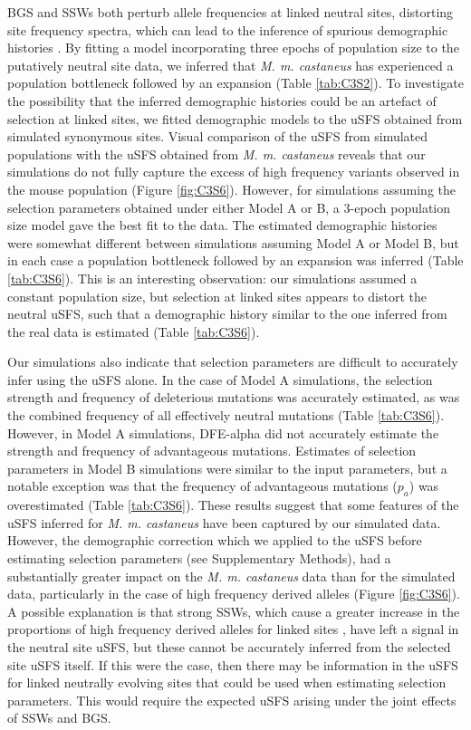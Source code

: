 	BGS and SSWs both perturb allele frequencies at linked neutral sites, distorting site frequency spectra, which can lead to the inference of spurious demographic histories \citep{RN149, RN241, RN242}. By fitting a model incorporating three epochs of population size to the putatively neutral site data, we inferred that \textit{M. m. castaneus} has experienced a population bottleneck followed by an expansion (Table \ref{tab:C3S2}). To investigate the possibility that the inferred demographic histories could be an artefact of selection at linked sites, we fitted demographic models to the uSFS obtained from simulated synonymous sites. Visual comparison of the uSFS from simulated populations with the uSFS obtained from \textit{M. m. castaneus} reveals that our simulations do not fully capture the excess of high frequency variants observed in the mouse population (Figure \ref{fig:C3S6}). However, for simulations assuming the selection parameters obtained under either Model A or B, a 3-epoch population size model gave the best fit to the data. The estimated demographic histories were somewhat different between simulations assuming Model A or Model B, but in each case a population bottleneck followed by an expansion was inferred (Table \ref{tab:C3S6}). This is an interesting observation: our simulations assumed a constant population size, but selection at linked sites appears to distort the neutral uSFS, such that a demographic history similar to the one inferred from the real data is estimated (Table \ref{tab:C3S6}).  

	Our simulations also indicate that selection parameters are difficult to accurately infer using the uSFS alone. In the case of Model A simulations, the selection strength and frequency of deleterious mutations was accurately estimated, as was the combined frequency of all effectively neutral mutations (Table \ref{tab:C3S6}). However, in Model A simulations, DFE-alpha did not accurately estimate the strength and frequency of advantageous mutations. Estimates of selection parameters in Model B simulations were similar to the input parameters, but a notable exception was that the frequency of advantageous mutations ($p_a$) was overestimated (Table \ref{tab:C3S6}). These results suggest that some features of the uSFS inferred for \textit{M. m. castaneus} have been captured by our simulated data. However, the demographic correction which we applied to the uSFS before estimating selection parameters (see Supplementary Methods), had a substantially greater impact on the \textit{M. m. castaneus} data than for the simulated data, particularly in the case of high frequency derived alleles (Figure \ref{fig:C3S6}). A possible explanation is that strong SSWs, which cause a greater increase in the proportions of high frequency derived alleles for linked sites \citep{RN343}, have left a signal in the neutral site uSFS, but these cannot be accurately inferred from the selected site uSFS itself. If this were the case, then there may be information in the uSFS for linked neutrally evolving sites that could be used when estimating selection parameters. This would require the expected uSFS arising under the joint effects of SSWs and BGS.

